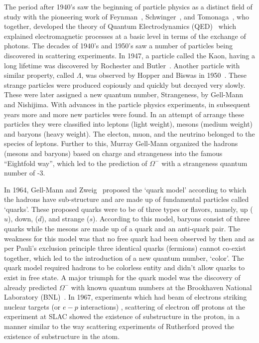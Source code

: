 The period after 1940's saw the beginning of particle physics as a distinct field of study with the pioneering work of 
Feynman~\cite{Feynman:1948ur,Feynman:1948km,Feynman:1949hz}, Schwinger~\cite{Schwinger:1948iu,Schwinger:1948yk}, and Tomonaga~\cite{Tomonaga:1948zz},
who together, developed the theory of Quantum Electrodynamics (\gls{QED})~\cite{Dyson:1949bp} which explained electromagnetic processes at a basic 
level in terms of the exchange of photons. The decades of 1940's and 1950's saw a number of particles being discovered in scattering experiments. In 
1947, a particle called the Kaon, having a long lifetime was discovered by Rochester and Butler~\cite{Rochester:1947mi}. Another particle with 
similar property, called $\Lambda$, was observed by Hopper and Biswas in 1950~\cite{PhysRev.80.1099}. These strange particles were produced copiously 
and quickly but decayed very slowly. These were later assigned a new quantum number, Strangeness, by Gell-Mann and Nishijima. With advances in the 
particle physics experiments, in subsequent years more and more new particles were found. In an attempt of arrange these particles they were classified 
into leptons (light weight), mesons (medium weight) and baryons (heavy weight). The electon, muon, and the neutrino belonged to the species of leptons. 
Further to this, Murray Gell-Mann organized the hadrons (mesons and baryons) based on charge and strangeness into the famous ``Eightfold way'', which 
led to the prediction of $\Omega^{-}$ with a strangeness quantum number of -3.

In 1964, Gell-Mann and Zweig~\cite{GellMann:1964nj,Zweig:570209} proposed the `quark model' according to which the hadrons have sub-structure and are
made up of fundamental particles called `quarks'. These proposed quarks were to be of three types or flavors, namely, up ($u$), down, ($d$),
and strange ($s$). According to this model, baryons consist of three quarks while the mesons are made up of a quark and an anti-quark pair.
 The weakness for this model was that no free quark had been observed by then and as per Pauli's exclusion principle three identical quarks (fermions) 
cannot co-exist together, which led to the introduction of a new quantum number, `color'. The quark model required hadrons to be colorless entity and 
didn't allow quarks to exist in free state. A major triumph for the quark model was the discovery of already predicted $\Omega^{-}$ with known
quantum numbers at the Brookhaven National Laboratory (BNL)~\cite{Barnes:1964pd}. In 1967, experiments which had beam of electrons striking nuclear 
targets (or $e-p$ interactions) \ie, scattering of electron off protons at the experiment at \gls{SLAC} showed the existence of substructure in the 
proton, in a manner similar to the way scattering experiments of Rutherford proved the existence of substructure in the atom.

